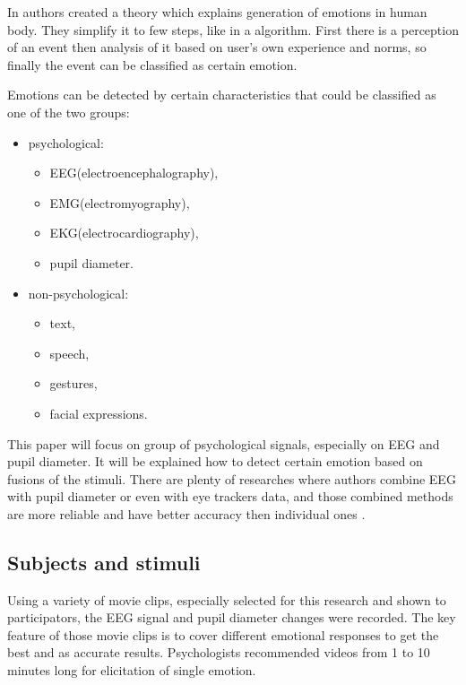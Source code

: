 \documentclass[10pt,journal,compsoc,twoside]{IEEEtran}
\begin{document}
In \cite{OrtonyCloreCollins1988} authors created a theory which explains generation of emotions in human body. They simplify it to few steps, like in a algorithm. First there is a perception of an event then analysis of it based on user's own experience and norms, so finally the event can be classified as certain emotion.

Emotions can be detected by certain characteristics that could be classified as one of the two groups:
\begin{itemize}
	\item psychological:
	\begin{itemize}
		\item EEG(electroencephalography),
		\item EMG(electromyography), 
		\item EKG(electrocardiography), 
		\item pupil diameter.
	\end{itemize} 
	\item non-psychological: 
	\begin{itemize} 
		\item text, 
		\item speech,
		\item  gestures, 
		\item facial expressions.
	\end{itemize}
\end{itemize}
This paper will focus on group of psychological signals, especially on EEG and pupil diameter. It will be explained how to detect certain emotion based on fusions of the stimuli. There are plenty of researches where authors combine EEG with pupil diameter or even with eye trackers data, and those combined methods are more reliable and have better accuracy then individual ones \cite{WeiLongBoNanBaoLiang2014,CalvoDMello2010,SoleymaniPanticPun2002}. 

\subsection{Subjects and stimuli}
Using a variety of movie clips, especially selected for this research and shown to participators, the EEG signal and pupil diameter changes were recorded. The key feature of those movie clips is to cover different emotional responses to get the best and as accurate results. Psychologists recommended videos from 1 to 10 minutes long for elicitation of single emotion\cite{SchaeferNilsSanchezPhilippot2010}.
\end{document}
